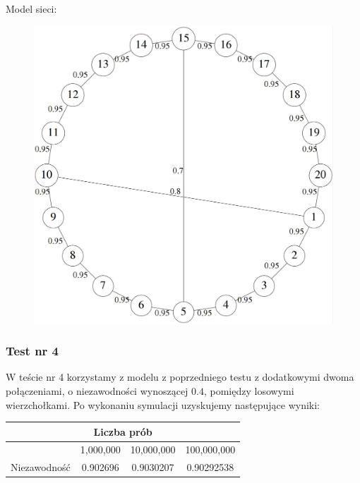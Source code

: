 \documentclass[titlepage]{article}
\begin{document}
\noindent Model sieci:
\begin{figure}[h!]
	\centering
	\includegraphics[width=0.8\linewidth]{graph3.jpg}
\end{figure}

\newpage
\subsubsection{Test nr 4}
W teście nr 4 korzystamy z modelu z poprzedniego testu z dodatkowymi dwoma połączeniami, o niezawodności wynoszącej $0.4$, pomiędzy losowymi wierzchołkami. Po wykonaniu symulacji uzyskujemy następujące wyniki:
\begin{table}[h!]
	\centering
    \label{tab:table4}
    \begin{tabular}{|c|c|c|c|}
    		\multicolumn{4}{c}{Liczba prób}\\
    		\hline
      	& 1,000,000 & 10,000,000 & 100,000,000\\
      	\hline
      	Niezawodność & 0.902696 & 0.9030207 & 0.90292538\\
		\hline
    \end{tabular}
\end{table}
\end{document}
